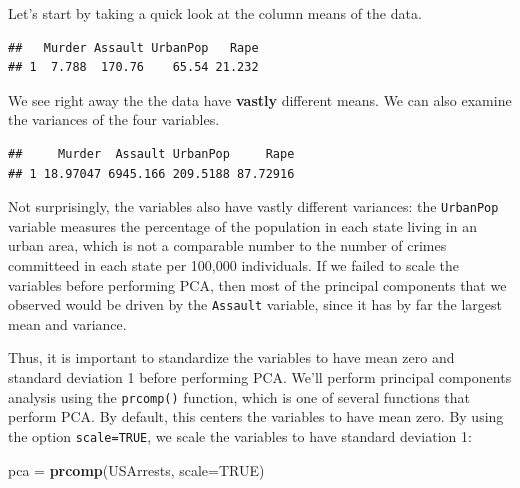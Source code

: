 \documentclass[openany]{book}
\newenvironment{Shaded}{\begin{snugshade}}{\end{snugshade}}
\newcommand{\DataTypeTok}[1]{\textcolor[rgb]{0.13,0.29,0.53}{#1}}
\newcommand{\KeywordTok}[1]{\textcolor[rgb]{0.13,0.29,0.53}{\textbf{#1}}}
\newcommand{\NormalTok}[1]{#1}
\newcommand{\OperatorTok}[1]{\textcolor[rgb]{0.81,0.36,0.00}{\textbf{#1}}}
\newcommand{\OtherTok}[1]{\textcolor[rgb]{0.56,0.35,0.01}{#1}}
\newcommand{\StringTok}[1]{\textcolor[rgb]{0.31,0.60,0.02}{#1}}
\begin{document}
Let's start by taking a quick look at the column means of the data.

\begin{Shaded}
\end{Shaded}

\begin{verbatim}
##   Murder Assault UrbanPop   Rape
## 1  7.788  170.76    65.54 21.232
\end{verbatim}

We see right away the the data have \textbf{vastly} different means. We can also examine the variances of the four variables.

\begin{Shaded}
\end{Shaded}

\begin{verbatim}
##     Murder  Assault UrbanPop     Rape
## 1 18.97047 6945.166 209.5188 87.72916
\end{verbatim}

Not surprisingly, the variables also have vastly different variances: the
\texttt{UrbanPop} variable measures the percentage of the population in each state
living in an urban area, which is not a comparable number to the number
of crimes committeed in each state per 100,000 individuals. If we failed to scale the
variables before performing PCA, then most of the principal components
that we observed would be driven by the \texttt{Assault} variable, since it has by
far the largest mean and variance.

Thus, it is important to standardize the
variables to have mean zero and standard deviation 1 before performing
PCA. We'll perform principal components analysis using the \texttt{prcomp()} function, which is one of several functions that perform PCA. By default, this centers the variables to have mean zero. By using the option \texttt{scale=TRUE}, we scale the variables to have standard
deviation 1:

\begin{Shaded}
\begin{Highlighting}[]
\NormalTok{pca =}\StringTok{ }\KeywordTok{prcomp}\NormalTok{(USArrests, }\DataTypeTok{scale=}\OtherTok{TRUE}\NormalTok{)}
\end{Highlighting}
\end{Shaded}
\end{document}
